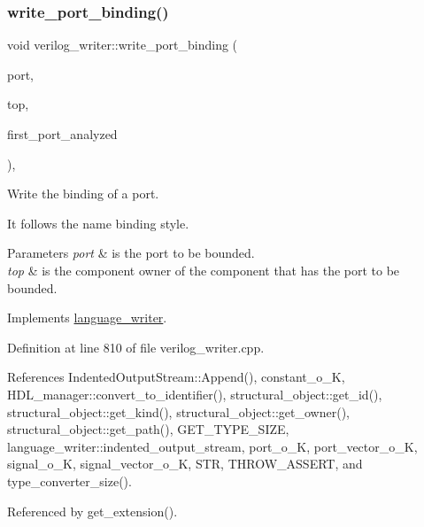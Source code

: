 \subsubsection{\texorpdfstring{write\+\_\+port\+\_\+binding()}{write\_port\_binding()}}
{\footnotesize\ttfamily void verilog\+\_\+writer\+::write\+\_\+port\+\_\+binding (\begin{DoxyParamCaption}\item[{const \hyperlink{structural__objects_8hpp_a8ea5f8cc50ab8f4c31e2751074ff60b2}{structural\+\_\+object\+Ref} \&}]{port,  }\item[{const \hyperlink{structural__objects_8hpp_a8ea5f8cc50ab8f4c31e2751074ff60b2}{structural\+\_\+object\+Ref} \&}]{top,  }\item[{bool \&}]{first\+\_\+port\+\_\+analyzed }\end{DoxyParamCaption})\hspace{0.3cm}{\ttfamily [override]}, {\ttfamily [virtual]}}



Write the binding of a port. 

It follows the name binding style. 
\begin{DoxyParams}{Parameters}
{\em port} & is the port to be bounded. \\
\hline
{\em top} & is the component owner of the component that has the port to be bounded. \\
\hline
\end{DoxyParams}


Implements \hyperlink{classlanguage__writer_aae06225ee079da7199d6f7e9f35fa108}{language\+\_\+writer}.



Definition at line 810 of file verilog\+\_\+writer.\+cpp.



References Indented\+Output\+Stream\+::\+Append(), constant\+\_\+o\+\_\+K, H\+D\+L\+\_\+manager\+::convert\+\_\+to\+\_\+identifier(), structural\+\_\+object\+::get\+\_\+id(), structural\+\_\+object\+::get\+\_\+kind(), structural\+\_\+object\+::get\+\_\+owner(), structural\+\_\+object\+::get\+\_\+path(), G\+E\+T\+\_\+\+T\+Y\+P\+E\+\_\+\+S\+I\+ZE, language\+\_\+writer\+::indented\+\_\+output\+\_\+stream, port\+\_\+o\+\_\+K, port\+\_\+vector\+\_\+o\+\_\+K, signal\+\_\+o\+\_\+K, signal\+\_\+vector\+\_\+o\+\_\+K, S\+TR, T\+H\+R\+O\+W\+\_\+\+A\+S\+S\+E\+RT, and type\+\_\+converter\+\_\+size().



Referenced by get\+\_\+extension().

